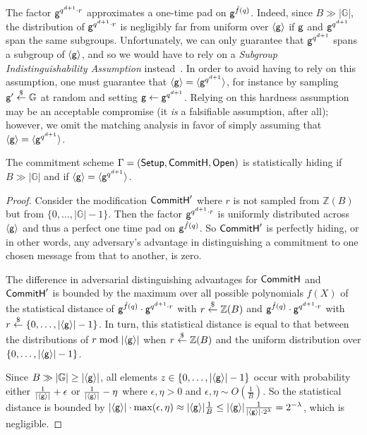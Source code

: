 The factor $\mathsf{g}^{q^{d+1} \cdot r}$ approximates a one-time pad on $\mathsf{g}^{\hat{f}(q)}$. Indeed, since $B \gg |\mathbb{G}|$, the distribution of $\mathsf{g}^{q^{d+1} \cdot r}$ is negligibly far from uniform over $\langle\mathsf{g}\rangle$ if $\mathsf{g}$ and $\mathsf{g}^{q^{d+1}}$ span the same subgroups. Unfortunately, we can only guarantee that $\mathsf{g}^{q^{d+1}}$ spans a subgroup of $\langle \mathsf{g} \rangle$, and so we would have to rely on a \emph{Subgroup Indistinguishability Assumption} instead~\cite{C:BraGol10}. In order to avoid having to rely on this assumption, one must guarantee that $\langle \mathsf{g} \rangle = \langle \mathsf{g}^{q^{d+1}} \rangle$, for instance by sampling $\mathsf{g}' \overset{\$}{\gets} \mathbb{G}$ at random and setting $\mathsf{g} \gets \mathsf{g}^{q^{d+1}}$. Relying on this hardness assumption may be an acceptable compromise (it \emph{is} a falsifiable assumption, after all); however, we omit the matching analysis in favor of simply assuming that $\langle \mathsf{g} \rangle = \langle \mathsf{g}^{q^{d+1}} \rangle$.

\begin{theorem}
The commitment scheme $\Gamma = (\textsf{{Setup}}, \textsf{{CommitH}}, \textsf{{Open}})$ is statistically hiding if $B \gg |\mathbb{G}|$ and if $\langle \mathsf{g} \rangle = \langle \mathsf{g}^{q^{d+1}} \rangle$.
\end{theorem}

\begin{proof}
Consider the modification $\textsf{{CommitH}}'$ where $r$ is not sampled from $\mathbb{Z}(B)$ but from $\{0,\ldots,|\mathbb{G}|-1\}$. Then the factor $\mathsf{g}^{q^{d+1} \cdot r}$ is uniformly distributed across $\langle \mathsf{g} \rangle$ and thus a perfect one time pad on $\mathsf{g}^{\hat{f}(q)}$. So $\textsf{{CommitH}}'$ is perfectly hiding, or in other words, any adversary's advantage in distinguishing a commitment to one chosen message from that to another, is zero.

The difference in adversarial distinguishing advantages for $\textsf{{CommitH}}$ and $\textsf{{CommitH}}'$ is bounded by the maximum over all possible polynomials $f(X)$ of the statistical distance of $\mathsf{g}^{\hat{f}(q)} \cdot \mathsf{g}^{q^{d+1} \cdot r}$ with $r \overset{\$}{\gets} \mathbb{Z}(B)$ and $\mathsf{g}^{\hat{f}(q)} \cdot \mathsf{g}^{q^{d+1} \cdot r}$ with $r \overset{\$}{\gets} \{0, \ldots, |\langle{}\mathsf{g}\rangle|-1\}$. In turn, this statistical distance is equal to that between the distributions of $r \bmod |\langle\mathsf{g}\rangle|$ when $r \overset{\$}{\gets} \mathbb{Z}(B)$ and the uniform distribution over $\{0, \ldots, |\langle{}\mathsf{g}\rangle|-1\}$.

Since $B \gg |\mathbb{G}| \geq |\langle\mathsf{g}\rangle|$, all elements $z \in \{0, \ldots, |\langle\mathsf{g}\rangle|-1\}$ occur with probability either $\frac{1}{|\langle\mathsf{g}\rangle|} + \epsilon$ or $\frac{1}{|\langle\mathsf{g}\rangle|} - \eta$ where $\epsilon, \eta > 0$ and $\epsilon, \eta \sim O(\frac{1}{B})$. So the statistical distance is bounded by $|\langle\mathsf{g}\rangle| \cdot \max(\epsilon, \eta) \approx |\langle\mathsf{g}\rangle| \frac{1}{B} \leq |\langle\mathsf{g}\rangle| \frac{1}{|\langle\mathsf{g}\rangle| \cdot 2^\lambda} = 2^{-\lambda}$, which is negligible.
\end{proof}

